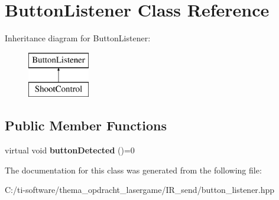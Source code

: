 \hypertarget{class_button_listener}{}\section{Button\+Listener Class Reference}
\label{class_button_listener}
Inheritance diagram for Button\+Listener\+:\begin{figure}[H]
\begin{center}
\leavevmode
\includegraphics[height=2.000000cm]{class_button_listener}
\end{center}
\end{figure}
\subsection*{Public Member Functions}
\begin{DoxyCompactItemize}
\item 
\mbox{\label{class_button_listener_a444f84514e359443020463edc129cd12}} 
virtual void {\bfseries button\+Detected} ()=0
\end{DoxyCompactItemize}


The documentation for this class was generated from the following file\+:\begin{DoxyCompactItemize}
\item 
C\+:/ti-\/software/thema\+\_\+opdracht\+\_\+lasergame/\+I\+R\+\_\+send/button\+\_\+listener.\+hpp\end{DoxyCompactItemize}
